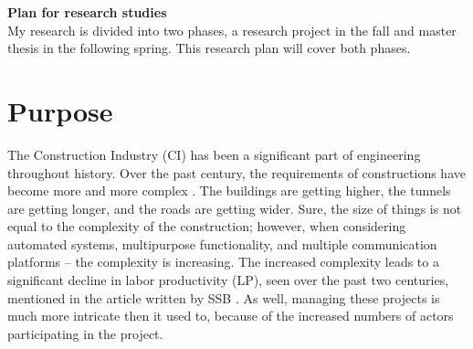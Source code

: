 {\bf \Huge Plan for research studies} \\[0.5cm]
My research is divided into two phases, a research project in the fall and master thesis in the following spring. This research plan will cover both phases.
\section*{Purpose}

The Construction Industry (CI) has been a significant part of engineering throughout history. Over the past century, the requirements of constructions have become more and more complex \cite{wood2009factors}. The buildings are getting higher, the tunnels are getting longer, and the roads are getting wider. Sure, the size of things is not equal to the complexity of the construction; however, when considering automated systems, multipurpose functionality, and multiple communication platforms – the complexity is increasing. The increased complexity leads to a significant decline in labor productivity (LP), seen over the past two centuries, mentioned in the article written by SSB \cite{productivity}. As well, managing these projects is much more intricate then it used to, because of the increased numbers of actors participating in the project. 

